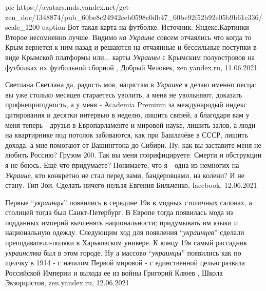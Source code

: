 \ifcmt
  pic https://avatars.mds.yandex.net/get-zen_doc/1348874/pub_60be8c24942ceb0598e0db47_60be92f52b92e05b9b61c336/scale_1200
  caption Вот такая карта на футболке. Источник: Яндекс.Картинки
\fi
Второе несомненно лучше. Видимо \emph{на Украине} совсем отчаялись что когда то
Крым вернется к ним назад и решаются на отчаянные и бессильные поступки в виде
Крымской платформы или... карты \emph{Украины} с Крымским полуостровов на
футболках их футбольной сборной
, 
Добрый Человек, zen.yandex.ru, 11.06.2021

Светлана Светлана да, радость моя, нацистам в \emph{Украине} я делаю именно
песца: вы уже столько месяцев стараетесь уволить, а меня не увольняют, доказать
профнепригодность, а у меня - Асademia Premium за международый индекс
цитирования и десятки интервью в неделю, лишить связей, а благодаря вам у меня
теперь - друзья в Европарламенте и мировой науке, лишить залов, а люди на
квартирнике под потолок забиваются, как при Башлачёве в СССР, лишить дохода, а
мне помогают от Вашингтона до Сибири. Ну, как вы заставите меня не любить
Россию? Грузом 200. Так вы меня глорифицируете. Смерти и обструкции я не боюсь.
Ещё что придумаете? Понимаете, что я - одна из немногих на \emph{Украине}, кто
конкретно не стал перед вами, бандеровцами, на колени? И не стану. Тип Зои.
Сделать ничего нельзя
Евгения Бильченко, facebook, 12.06.2021

  
Первые \enquote{\emph{украинцы}} появились в середине 19в в модных столичных салонах, а
столицей тогда был Санкт-Петербург. В Европе тогда появилась мода из подданных
империй вычленять национальности; придумывать им языки и национальную одежду.
Следующим ход для появления \enquote{\emph{украинцев}} сделали преподаватели-поляки в
Харьковском универе. К концу 19в самый рассадник \emph{украинства} был в этом городе.
Ну а массово \enquote{\emph{украинцы}} появились как по щелчку в 1914 - с началом Первой
мировой - с единственной целью развала Российской Империи и выхода ее из войны
Григорий Клюев
, 
Школа Экзорцистов, zen.yandex.ru, 12.06.2021

